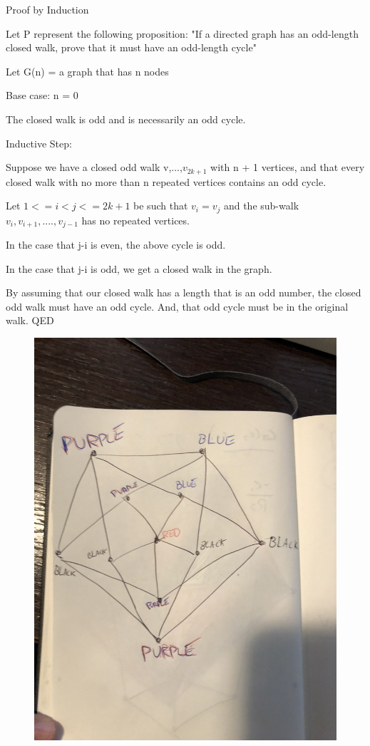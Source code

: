\documentclass{6042}
\begin{document}
Proof by Induction

Let P represent the following proposition: "If a directed graph has an odd-length closed walk, prove that it must have an
odd-length cycle"

Let G(n) = a graph that has n nodes

Base case: n = 0

The closed walk is odd and is necessarily an odd cycle.

Inductive Step: 

Suppose we have a closed odd walk v,...,$v_{2k+1}$ with n + 1 vertices, and that every closed walk with no more than n repeated vertices contains an odd cycle.

Let $1 <= i < j <= 2k + 1$ be such that $v_{i} = v_{j}$ and the sub-walk $v_{i}, v_{i+1},...., v_{j-1}$ has no repeated vertices.

In the case that j-i is even, the above cycle is odd.

In the case that j-i is odd, we get a closed walk in the graph.

By assuming that our closed walk has a length that is an odd number, the closed odd walk must have an odd cycle. And, that odd cycle must be in the original walk. QED




\begin{figure}[h!]
    \includegraphics[angle=-90, origin=c, width=0.6\linewidth]{prob5graph.jpg}

\end{figure}
\end{document}
